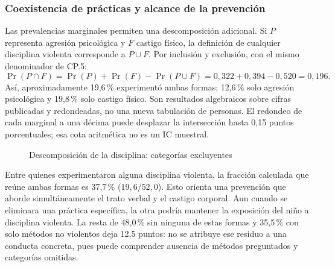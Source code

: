 \subsubsection{Coexistencia de prácticas y alcance de la prevención}
Las prevalencias marginales permiten una descomposición adicional. Si $P$
representa agresión psicológica y $F$ castigo físico, la definición de
cualquier disciplina violenta corresponde a $P\cup F$. Por inclusión y
exclusión, con el mismo denominador de CP.5:
\begin{equation}
 \Pr(P\cap F)=\Pr(P)+\Pr(F)-\Pr(P\cup F)
 =0{,}322+0{,}394-0{,}520=0{,}196.
 \label{eq:solapamiento}
\end{equation}
Así, aproximadamente 19,6\,\% experimentó ambas formas; 12,6\,\% solo agresión
psicológica y 19,8\,\% solo castigo físico. Son resultados algebraicos sobre
cifras publicadas y redondeadas, no una nueva tabulación de personas.
El redondeo de cada marginal a una décima puede desplazar la intersección
hasta 0,15 puntos porcentuales; esa cota aritmética no es un IC muestral.

\begin{figure}[htbp]\centering
{}
\caption{Descomposición de la disciplina: categorías excluyentes}\label{fig:solapamiento}
\end{figure}

Entre quienes experimentaron alguna disciplina violenta, la fracción
calculada que reúne ambas formas es 37,7\,\% ($19{,}6/52{,}0$). Esto orienta
una prevención que aborde simultáneamente el trato verbal y el castigo
corporal. Aun cuando se eliminara una práctica específica, la otra podría
mantener la exposición del niño a disciplina violenta. La resta de 48,0\,\%
sin ninguna de estas formas y 35,5\,\% con solo métodos no violentos deja
12,5 puntos: no se atribuye ese residuo a una conducta concreta, pues puede
comprender ausencia de métodos preguntados y categorías omitidas.

